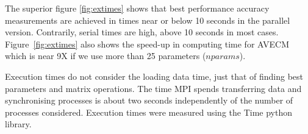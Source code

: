 The superior figure \ref{fig:extimes} shows that best performance accuracy
measurements are achieved in times near or below 10 seconds in the parallel
version. Contrarily, serial times are high, above 10 seconds in most cases.
Figure~\ref{fig:extimes} also shows the speed-up in computing time for AVECM
which is near 9X if we use more than 25 parameters ($nparams$).

Execution times do not consider the loading data time, just that of finding best
parameters and matrix operations. The time MPI spends transferring data and
synchronising processes is about two seconds independently of the number of
processes considered. Execution times were measured using the Time python
library.

